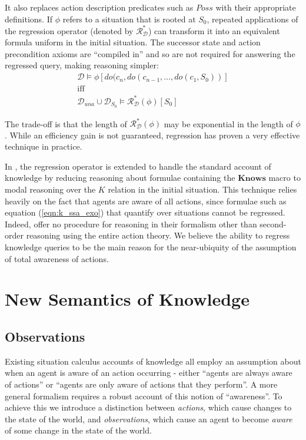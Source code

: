 \documentclass{ifaamas-submission}
\begin{document}
It also replaces action description predicates such as $Poss$ with
their appropriate definitions. If $\phi$ refers to a situation that
is rooted at $S_{0}$, repeated applications of the regression operator
(denoted by $\mathcal{R}_{\mathcal{D}}^{*}$) can transform it into
an equivalent formula uniform in the initial situation. The successor
state and action precondition axioms are {}``compiled in'' and so
are not required for answering the regressed query, making reasoning
simpler:\begin{gather*}
\mathcal{D}\models\phi[do(c_{n},do(c_{n-1},\dots,do(c_{1},S_{0}))]\\
\mathrm{iff}\\
\mathcal{D}_{una}\cup\mathcal{D}_{S_{0}}\models\mathcal{R}_{\mathcal{D}}^{*}(\phi)[S_{0}]\end{gather*}


The trade-off is that the length of $\mathcal{R}_{\mathcal{D}}^{*}(\phi)$
may be exponential in the length of $\phi$. While an efficiency gain
is not guaranteed, regression has proven a very effective technique
in practice.

In \cite{scherl03sc_knowledge}, the regression operator is extended
to handle the standard account of knowledge by reducing reasoning
about formulae containing the $\mathbf{Knows}$ macro to modal reasoning
over the $K$ relation in the initial situation. This technique relies
heavily on the fact that agents are aware of all actions, since formulae
such as equation (\ref{eqn:k_ssa_exo}) that quantify over situations
cannot be regressed. Indeed, \cite{Lesperance99sitcalc_approach}
offer no procedure for reasoning in their formalism other than second-order
reasoning using the entire action theory. We believe the ability to
regress knowledge queries to be the main reason for the near-ubiquity
of the assumption of total awareness of actions.


\section{New Semantics of Knowledge}

\label{sec:New-Semantics}


\subsection{Observations}

Existing situation calculus accounts of knowledge all employ an assumption
about when an agent is aware of an action occurring - either {}``agents
are always aware of actions'' or {}``agents are only aware of actions
that they perform''. A more general formalism requires a robust account
of this notion of {}``awareness''. To achieve this we introduce
a distinction between \emph{actions}, which cause changes to the state
of the world, and \emph{observations}, which cause an agent to become
\emph{aware} of some change in the state of the world.
\end{document}
